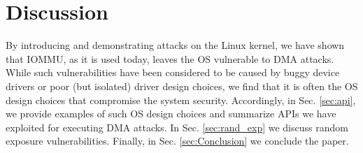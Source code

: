 

\section{Discussion}





By introducing and demonstrating \compound{} attacks on the Linux kernel, we have shown that IOMMU, as it is used today, leaves the OS vulnerable to DMA attacks. While such vulnerabilities have been considered to be caused by buggy device drivers or poor (but isolated) driver design choices, we find that it is often the OS design choices that compromise the system security.
Accordingly, in Sec. \ref{sec:api}, we provide examples of such OS design choices and summarize APIs we have exploited for executing \compound{} DMA attacks. In Sec. \ref{sec:rand_exp} we discuss random exposure vulnerabilities. Finally, in Sec. \ref{sec:Conclusion} we conclude the paper.

